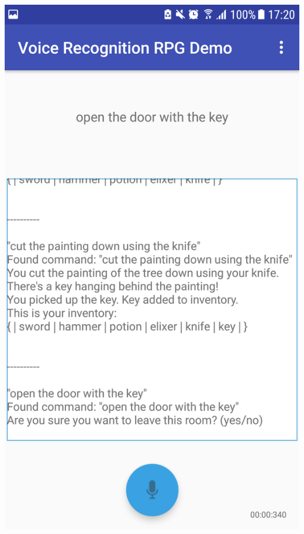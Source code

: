 \documentclass[11pt]{article}
\begin{document}
\begin{appendices}
\begin{center}
\includegraphics[scale=0.18]{overworld-3.png}

\end{center}
\end{appendices}
\end{document}
